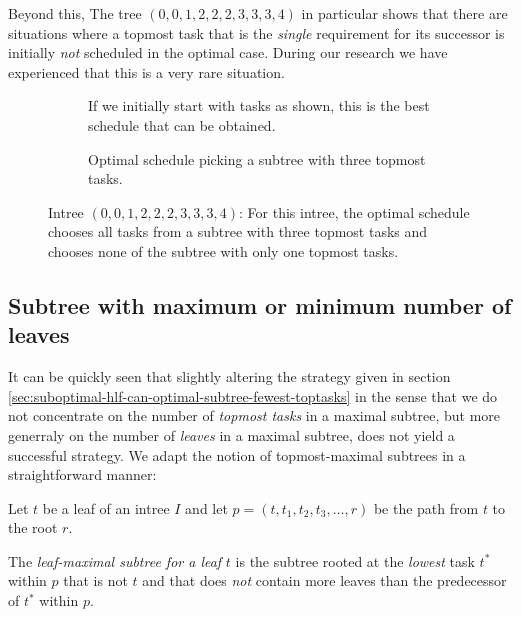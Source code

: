 Beyond this, The tree $(0,0,1,2,2,2,3,3,3,4)$ in particular shows that there are situations where a topmost task that is the \emph{single} requirement for its successor is initially \emph{not} scheduled in the optimal case. During our research we have experienced that this is a very rare situation.

\begin{figure}[ht]
  \centering
  \begin{subfigure}{.45\textwidth}
    \centering
    
    \caption{If we initially start with tasks as shown, this is the best schedule that can be obtained.}
  \end{subfigure}
  \quad
  \begin{subfigure}{.45\textwidth}
    \centering
    
    \caption{Optimal schedule picking a subtree with three topmost tasks.}
  \end{subfigure}
\caption{Intree $(0,0,1,2,2,2,3,3,3,4)$: For this intree, the optimal schedule chooses all tasks from a subtree with three topmost tasks and chooses none of the subtree with only one topmost tasks.}
  \label{fig:subtree-with-fewest-toptasks-suboptimal}
\end{figure}

\subsection{Subtree with maximum or minimum number of leaves}
\label{sec:suboptimal-hlf-can-optimal-subtree-fewest-leaves}

It can be quickly seen that slightly altering the strategy given in section \ref{sec:suboptimal-hlf-can-optimal-subtree-fewest-toptasks} in the sense that we do not concentrate on the number of \emph{topmost tasks} in a maximal subtree, but more generraly on the number of \emph{leaves} in a maximal subtree, does not yield a successful strategy. We adapt the notion of topmost-maximal subtrees in a straightforward manner:

\begin{definition}
  Let $t$ be a leaf of an intree $I$ and let $p=(t, t_1, t_2, t_3, \dots, r)$ be the path from $t$ to the root $r$.

  The \emph{leaf-maximal subtree for a leaf} $t$ is the subtree rooted at the \emph{lowest} task $t^*$ within $p$ that is not $t$ and that does \emph{not} contain more leaves than the predecessor of $t^*$ within $p$.
\end{definition}

